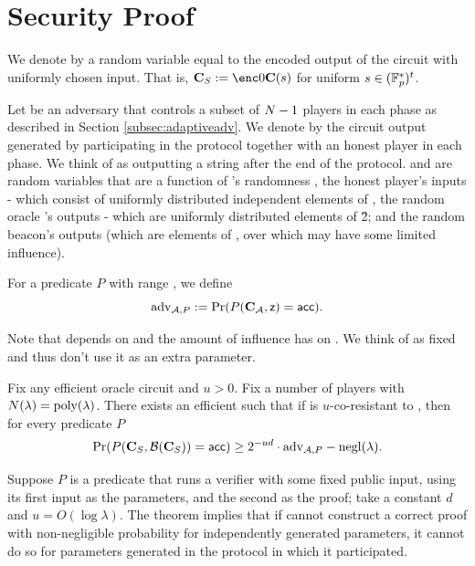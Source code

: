 \documentclass{article}
\begin{document}
\section{Security Proof}
\label{sec:proof}
We denote by \randoutput a random variable equal to the encoded output of the circuit \circ with uniformly chosen input.
That is, $\randoutput\defeq \enc0{\circ(s)}$ for uniform $s\in ({\mathbb F}_p^*)^t$.

Let \adv be an adversary that controls a subset of $N-1$ players in each phase
as described in Section \ref{subsec:adaptiveadv}.
We denote by \protoutput the circuit output generated by \adv participating in the protocol together with an honest player in each phase.
We think of \adv as outputting a string \extra after the end of the protocol.
 \protoutput and \extra are random variables
that are a function of  \adv's randomness \advrand, the honest player's inputs - which consist of uniformly distributed independent elements of \Fstar, the random oracle \RO's outputs - which are uniformly distributed elements of \G2; and the random beacon's outputs \beaconrand (which are elements of \Fstar, over which \adv may have some limited influence).

For a predicate $P$  with range \set{\acp,\rej}, we define 
\[\mathrm{adv}_{\mathcal{A},P}:= \mathrm{Pr}( P(\mathbf{C}_\mathcal{A},\mathsf{z})=\mathsf{acc} ).\]

Note that  depends on \RB and the amount of influence \adv has on \RB.
We think of \RB as fixed and thus don't use it as an extra parameter.



\begin{thm}\label{thm:security}
Fix any efficient oracle circuit \adv and $u>0$. Fix a number of players \numplayers with $N(\lambda) = \rm{poly(\lambda})$. 
There exists an efficient \advv such that if \RB is $u$-co-resistant to \adv, then for every predicate $P$
\[\mathrm{Pr}(P(\mathbf{C}_S,{\cal B}(\mathbf{C}_S))=\mathsf{acc}) \geq 2^{-ud}\cdot \mathrm{adv}_{\mathcal{A},P} -\mathrm{negl}(\lambda).\]

\end{thm}

Suppose $P$ is a predicate that runs a {\snark} verifier with some fixed public input, using its first input as the {\snark} parameters,
and the second as the proof; take a constant $d$ and $u = O(\log \lambda)$. The theorem implies that if \adv cannot construct a correct proof with 
non-negligible probability for independently generated parameters, it cannot do so for parameters generated in the protocol in which it participated.
\end{document}
